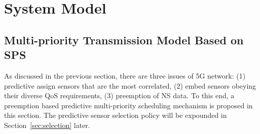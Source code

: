 \documentclass{SCIS2021}
\begin{document}

	\section{System Model}
	\label{model}

	\subsection{Multi-priority Transmission Model Based on SPS}
	\label{sssec:preemption}
	{\color{black}As discussed in the previous section, there are three issues of 5G network: (1) predictive assign sensors that are the most correlated, (2) embed sensors obeying their diverse QoS requirements, (3) preemption of NS data. To this end, a preemption based predictive multi-priority scheduling mechanism is proposed in this section. The predictive sensor selection policy will be expounded in Section~\ref{sec:selection} later.}
\end{document}
